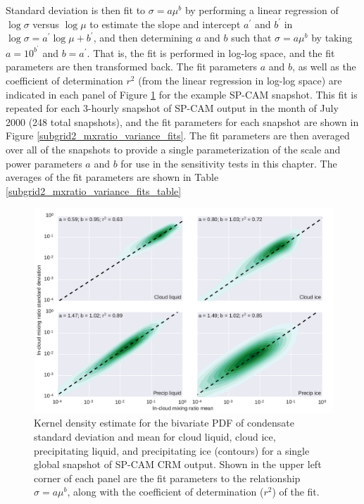 Standard deviation is then fit to $\sigma = a \mu^b$ by performing a linear regression of $\log\sigma$ versus $\log \mu$ to estimate the slope and intercept $a^{\prime}$ and $b^{\prime}$ in $\log \sigma = a^{\prime} \log \mu + b^{\prime}$, and then determining $a$ and $b$ such that $\sigma = a \mu^b$ by taking $a = 10^{b^{\prime}}$ and $b = a^{\prime}$. That is, the fit is performed in log-log space, and the fit parameters are then transformed back. The fit parameters $a$ and $b$, as well as the coefficient of determination $r^2$ (from the linear regression in log-log space) are indicated in each panel of Figure \ref{subgrid2_mxratio_variance} for the example SP-CAM snapshot. This fit is repeated for each 3-hourly snapshot of SP-CAM output in the month of July 2000 (248 total snapshots), and the fit parameters for each snapshot are shown in Figure \ref{subgrid2_mxratio_variance_fits}. The fit parameters are then averaged over all of the snapshots to provide a single parameterization of the scale and power parameters $a$ and $b$ for use in the sensitivity tests in this chapter. The averages of the fit parameters are shown in Table \ref{subgrid2_mxratio_variance_fits_table}

\begin{figure}
\centering
\includegraphics[width=\columnwidth]{graphics/subgrid2_mxratio_variance.pdf}
\caption{Kernel density estimate for the bivariate PDF of condensate standard deviation and mean for cloud liquid, cloud ice, precipitating liquid, and precipitating ice (contours) for a single global snapshot of SP-CAM CRM output. Shown in the upper left corner of each panel are the fit parameters to the relationship $\sigma = a \mu^b$, along with the coefficient of determination ($r^2$) of the fit.}
\label{subgrid2_mxratio_variance}
\end{figure}


